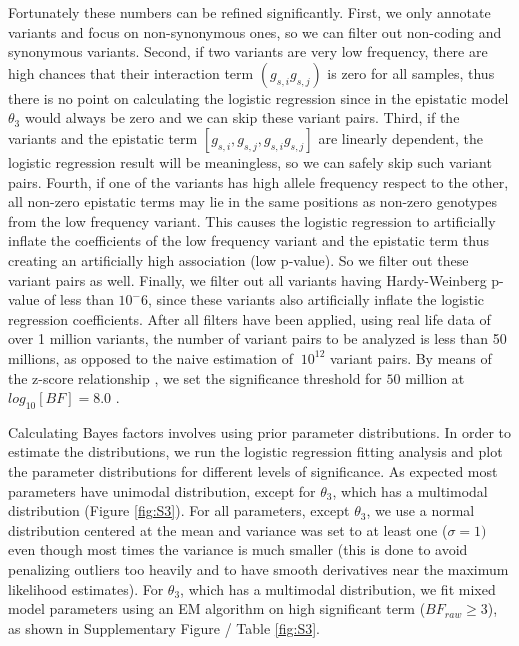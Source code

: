 Fortunately these numbers can be refined significantly. First, we only annotate variants and focus on non-synonymous ones, so we can filter out non-coding and synonymous variants. Second, if two variants are very low frequency, there are high chances that their interaction term $(g_{s,i} g_{s,j})$ is zero for all samples, thus there is no point on calculating the logistic regression since in the epistatic model $\theta_3$ would always be zero and we can skip these variant pairs. Third, if the variants and the epistatic term $[g_{s,i}, g_{s,j}, g_{s,i} g_{s,j}]$ are linearly dependent, the logistic regression result will be meaningless, so we can safely skip such variant pairs. Fourth, if one of the variants has high allele frequency respect to the other, all non-zero epistatic terms may lie in the same positions as non-zero genotypes from the low frequency variant. This causes the logistic regression to artificially inflate the coefficients of the low frequency variant and the epistatic term thus creating an artificially high association (low p-value). So we filter out these variant pairs as well. Finally, we filter out all variants having Hardy-Weinberg p-value of less than $10^-6$, since these variants also artificially inflate the logistic regression coefficients. After all filters have been applied, using real life data of over 1 million variants, the number of variant pairs to be analyzed is less than 50 millions, as opposed to the naive estimation of $~10^{12}$ variant pairs. By means of the z-score relationship \cite{Goodman}, we set the significance threshold for $50$ million at $log_{10}[BF] =  8.0$ .

Calculating Bayes factors involves using prior parameter distributions. In order to estimate the distributions, we run the logistic regression fitting analysis and plot the parameter distributions for different levels of significance. As expected most parameters have unimodal distribution, except for $\theta_3$, which has a multimodal distribution (Figure \ref{fig:S3}). For all parameters, except $\theta_3$, we use a normal distribution centered at the mean and variance was set to at least one ($\sigma=1)$ even though most times the variance is much smaller (this is done to avoid penalizing outliers too heavily and to have smooth derivatives near the maximum likelihood estimates). For $\theta_3$, which has a multimodal distribution, we fit mixed model parameters using an EM algorithm on high significant term ($BF_{raw} \ge 3$), as shown in Supplementary Figure / Table \ref{fig:S3}. 

